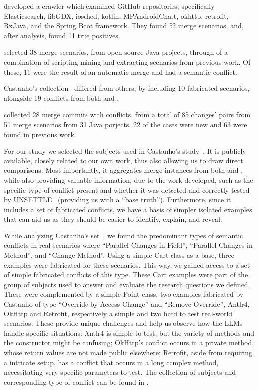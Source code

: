 \citet{kn:safemerge} developed a crawler which examined GitHub repositories, specifically Elasticsearch, libGDX, iosched, kotlin, MPAndroidChart, okhttp, retrofit, RxJava, and the Spring Boot framework. They found 52 merge scenarios,
and, after analysis, found 11 true positives.

\citet{kn:leuson} selected 38 merge scenarios, from open-source Java projects, through of a combination of scripting mining and extracting scenarios from previous work. Of these, 11 were the result of an automatic merge and had a semantic conflict.

Castanho's collection~\cite{kn:nuno} differed from others, by including 10 fabricated scenarios, alongside 19 conflicts from both \citet{kn:safemerge} and \citet{kn:leuson}.

\citet{kn:leuson2} collected 28 merge commits with conflicts, from a total of 85 changes' pairs from 51 merge scenarios from 31 Java porjects. 22 of the cases were new and 63 were found in previous work.

For our study we selected the subjects used in Castanho's study~\cite{kn:nuno}.  It is
publicly available, closely related to our own work, thus also allowing us to
draw direct comparisons.  Most importantly, it aggregates merge instances from
both \citet{kn:leuson} and \citet{kn:safemerge}, while also providing valuable
information, due to the work developed, such as the specific type of conflict
present and whether it was detected and correctly tested by UNSETTLE~\cite{kn:nuno}
(providing us with a ``base truth'').  Furthermore, since it includes a set of
fabricated conflicts, we have a basis of simpler isolated examples that can aid us as
they should be easier to identify, explain, and reveal.

While analyzing Castanho's set~\cite{kn:nuno}, we found the predominant types of semantic
conflicts in real scenarios where ``Parallel Changes in Field'', ``Parallel Changes in Method'',
and ``Change Method''.  Using a simple Cart class as a base, three examples were
fabricated for these scenarios.  This way, we gained access to a set of simple fabricated conflicts of this type.
These Cart examples were part of the group of subjects used to answer and evaluate the research questions we defined.  These were complemented by a simple Point class, two examples fabricated by Castanho of type ``Override by Access Change'' and ``Remove Override'', %
Antlr4, OkHttp and Retrofit, respectively a simple and two hard to test real-world scenarios.
These provide unique challenges and help us observe how the LLMs handle specific situations: Antlr4 is simple to test, but the variety of methods 
and the constructor might be confusing; OkHttp's conflict occurs in a private method, whose return values are not made
public elsewhere; Retrofit, aside from requiring a intricate setup, has a conflict that occurs in a long complex method,
necessitating very specific parameters to test.
The collection of subjects and corresponding type of conflict can be found in .

